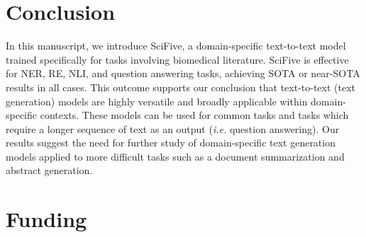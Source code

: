 \documentclass[nocrop]{bioinfo}
\begin{document}
\section{Conclusion}

In this manuscript, we introduce SciFive, a domain-specific text-to-text model trained specifically for tasks involving biomedical literature. SciFive is effective for NER, RE, NLI, and question answering tasks, achieving SOTA or near-SOTA results in all cases. This outcome supports our conclusion that text-to-text (text generation) models are highly versatile and broadly applicable within domain-specific contexts. These models can be used for common tasks and tasks which require a longer sequence of text as an output ({\it i.e.} question answering). Our results suggest the need for further study of domain-specific text generation models applied to more difficult tasks such as a document summarization and abstract generation.

\section*{Funding}
\end{document}
